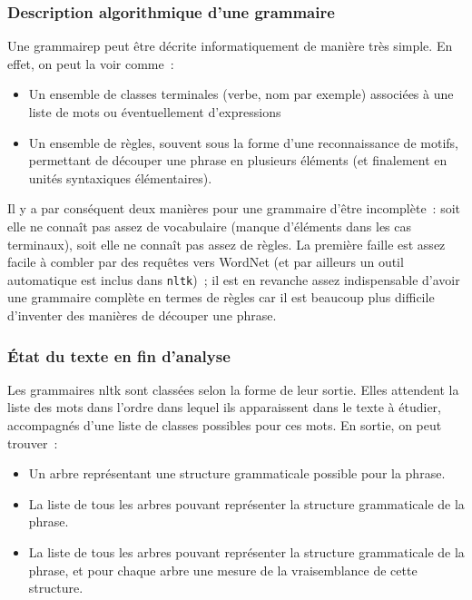 \documentclass[a4paper, 12pt]{article}
\newcommand{\pyt}[1]{\texttt{#1}}%
\begin{document}
\subsubsection{Description algorithmique d'une grammaire}
Une grammairep peut être décrite informatiquement de manière très simple. En effet, on peut la voir comme~:
\begin{itemize}
	\item Un ensemble de classes terminales (verbe, nom par exemple) associées à une liste de mots ou éventuellement d'expressions
	\item Un ensemble de règles, souvent sous la forme d'une reconnaissance de motifs, permettant de découper une phrase en plusieurs éléments (et finalement en unités syntaxiques élémentaires).
\end{itemize}

Il y a par conséquent deux manières pour une grammaire d'être incomplète~: soit elle ne connaît pas assez de vocabulaire (manque d'éléments dans les cas terminaux), soit elle ne connaît pas assez de règles. La première faille est assez facile à combler par des requêtes vers WordNet (et par ailleurs un outil automatique est inclus dans \pyt{nltk})~; il est en revanche assez indispensable d'avoir une grammaire complète en termes de règles car il est beaucoup plus difficile d'inventer des manières de découper une phrase.

\subsubsection{\'Etat du texte en fin d'analyse}
Les grammaires nltk sont classées selon la forme de leur sortie. Elles attendent la liste des mots dans l'ordre dans lequel ils apparaissent dans le texte à étudier, accompagnés d'une liste de classes possibles pour ces mots. En sortie, on peut trouver~:

\begin{itemize}
	\item Un arbre représentant une structure grammaticale possible pour la phrase.
	\item La liste de tous les arbres pouvant représenter la structure grammaticale de la phrase.
	\item La liste de tous les arbres pouvant représenter la structure grammaticale de la phrase, et pour chaque arbre une mesure de la vraisemblance de cette structure.
\end{itemize} 
\end{document}
